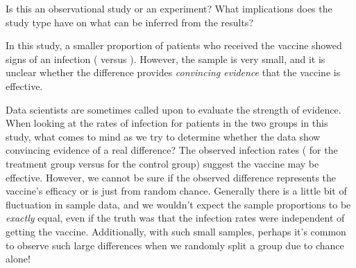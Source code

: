 \begin{exercisewrap}
\begin{nexercise}
Is this an observational study or an experiment?
What implications does the study type have on what can
be inferred from the results?\footnotemark{}
\end{nexercise}
\end{exercisewrap}

In this study, a smaller proportion of patients
who received the vaccine showed signs of an infection
(\malariaVIRPerc{} versus \malariaPIRPerc{}).
However, the sample is very small,
and it is unclear whether the difference provides
\emph{convincing evidence} that the vaccine is
effective.

\D{\newpage}

\begin{examplewrap}
\begin{nexample}{Data scientists are sometimes called
    upon to evaluate the strength of evidence.
    When looking at the rates of infection for patients
    in the two groups in this study,
    what comes to mind as we try to determine whether
    the data show convincing evidence of a real difference?}
  \label{malaria_vaccine_20_what_is_convincing}
  The observed infection rates
  (\malariaVIRPerc{} for the treatment group versus
  \malariaPIRPerc{} for the control group)
  suggest the vaccine may be effective.
  However, we cannot be sure if the observed difference
  represents the vaccine's efficacy or is just from
  random chance.
  Generally there is a little bit of fluctuation
  in sample data, and we wouldn't expect the sample
  proportions to be \emph{exactly} equal,
  even if the truth was that the infection rates
  were independent of getting the vaccine.
  Additionally, with such small samples,
  perhaps it's common to observe such large differences
  when we randomly split a group due to chance alone!
\end{nexample}
\end{examplewrap}

